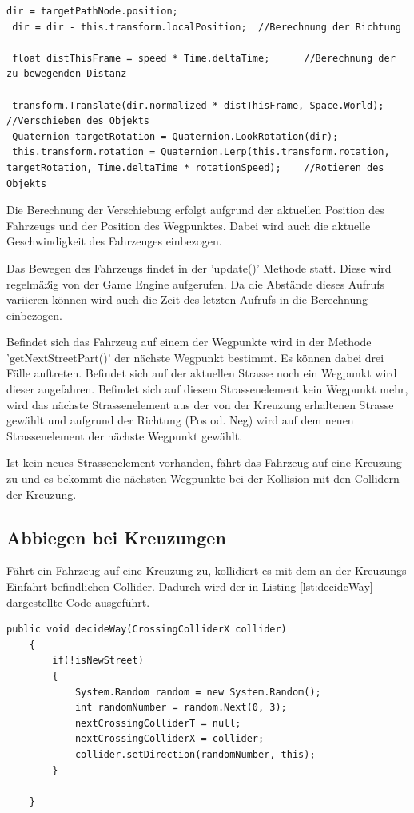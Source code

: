 \begin{lstlisting}[caption={Transformation der Fahrzeuge},label={lst:FollowWay}]
 dir = targetPathNode.position;
 dir = dir - this.transform.localPosition; 	//Berechnung der Richtung

 float distThisFrame = speed * Time.deltaTime;		//Berechnung der zu bewegenden Distanz

 transform.Translate(dir.normalized * distThisFrame, Space.World);		//Verschieben des Objekts
 Quaternion targetRotation = Quaternion.LookRotation(dir);			
 this.transform.rotation = Quaternion.Lerp(this.transform.rotation, targetRotation, Time.deltaTime * rotationSpeed);	//Rotieren des Objekts
\end{lstlisting}

Die Berechnung der Verschiebung erfolgt aufgrund der aktuellen Position des Fahrzeugs und der Position des Wegpunktes. Dabei wird auch die aktuelle Geschwindigkeit des Fahrzeuges einbezogen.

Das Bewegen des Fahrzeugs findet in der 'update()' Methode statt. Diese wird regelmäßig von der Game Engine aufgerufen. Da die Abstände dieses Aufrufs variieren können wird auch die Zeit des letzten Aufrufs in die Berechnung einbezogen.

Befindet sich das Fahrzeug auf einem der Wegpunkte wird in der Methode 'getNextStreetPart()' der nächste Wegpunkt bestimmt. Es können dabei drei Fälle auftreten. Befindet sich auf der aktuellen 
Strasse noch ein Wegpunkt wird dieser angefahren. Befindet sich auf diesem Strassenelement kein Wegpunkt mehr, wird das nächste Strassenelement aus der von der Kreuzung erhaltenen Strasse gewählt und aufgrund der Richtung (Pos od. Neg) wird auf dem neuen Strassenelement der nächste Wegpunkt gewählt.

Ist kein neues Strassenelement vorhanden, fährt das Fahrzeug auf eine Kreuzung zu und es bekommt die nächsten Wegpunkte bei der Kollision mit den Collidern der Kreuzung. 

\subsection{Abbiegen bei Kreuzungen}

Fährt ein Fahrzeug auf eine Kreuzung zu, kollidiert es mit dem an der Kreuzungs Einfahrt befindlichen Collider. Dadurch wird der in Listing \ref{lst:decideWay} dargestellte Code ausgeführt.

\begin{lstlisting}[caption={Abbiegeentscheidung auf einer Kreuzung},label={lst:decideWay}]
public void decideWay(CrossingColliderX collider)
    {
        if(!isNewStreet)
        {
            System.Random random = new System.Random();
            int randomNumber = random.Next(0, 3);
            nextCrossingColliderT = null;
            nextCrossingColliderX = collider;
            collider.setDirection(randomNumber, this);
        }

    }
\end{lstlisting}


